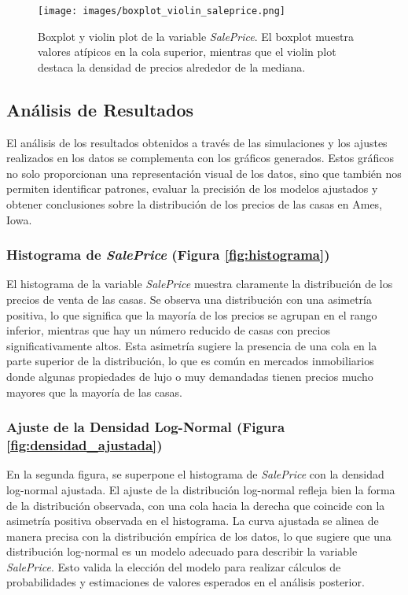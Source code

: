 \documentclass[12pt]{article}
\begin{document}
\begin{figure}[H]
    \centering
    \texttt{[image: images/boxplot\_violin\_saleprice.png]}
    \caption{Boxplot y violin plot de la variable \textit{SalePrice}. El boxplot muestra valores atípicos en la cola superior, mientras que el violin plot destaca la densidad de precios alrededor de la mediana.}
    \label{fig:boxplot_violin}
\end{figure}


\subsection{Análisis de Resultados}

El análisis de los resultados obtenidos a través de las simulaciones y los ajustes realizados en los datos se complementa con los gráficos generados. Estos gráficos no solo proporcionan una representación visual de los datos, sino que también nos permiten identificar patrones, evaluar la precisión de los modelos ajustados y obtener conclusiones sobre la distribución de los precios de las casas en Ames, Iowa.

\subsubsection{Histograma de \textit{SalePrice} (Figura \ref{fig:histograma})}
El histograma de la variable \textit{SalePrice} muestra claramente la distribución de los precios de venta de las casas. Se observa una distribución con una asimetría positiva, lo que significa que la mayoría de los precios se agrupan en el rango inferior, mientras que hay un número reducido de casas con precios significativamente altos. Esta asimetría sugiere la presencia de una cola en la parte superior de la distribución, lo que es común en mercados inmobiliarios donde algunas propiedades de lujo o muy demandadas tienen precios mucho mayores que la mayoría de las casas.

\subsubsection{Ajuste de la Densidad Log-Normal (Figura \ref{fig:densidad_ajustada})}
En la segunda figura, se superpone el histograma de \textit{SalePrice} con la densidad log-normal ajustada. El ajuste de la distribución log-normal refleja bien la forma de la distribución observada, con una cola hacia la derecha que coincide con la asimetría positiva observada en el histograma. La curva ajustada se alinea de manera precisa con la distribución empírica de los datos, lo que sugiere que una distribución log-normal es un modelo adecuado para describir la variable \textit{SalePrice}. Esto valida la elección del modelo para realizar cálculos de probabilidades y estimaciones de valores esperados en el análisis posterior.
\end{document}
